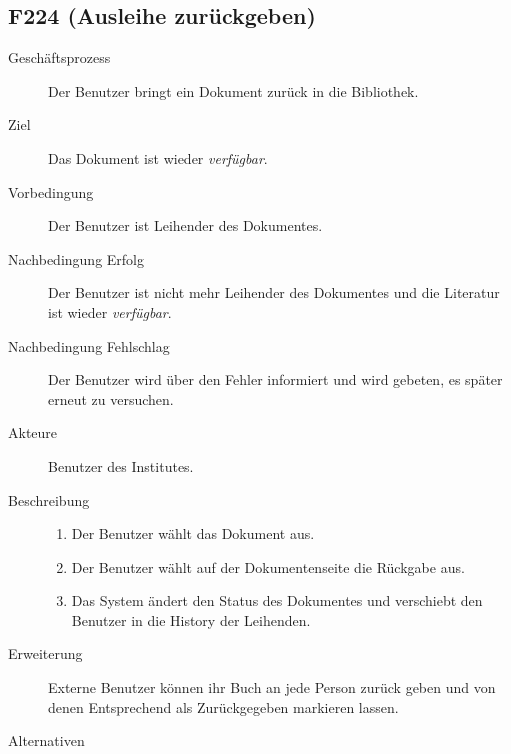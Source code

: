 \subsection{F224 (Ausleihe zurückgeben)}
\begin{description}
  \item[Geschäftsprozess]Der Benutzer bringt ein Dokument zurück in die Bibliothek.
  \item[Ziel]Das Dokument ist wieder \emph{verfügbar}.
  \item[Vorbedingung]Der Benutzer ist Leihender des Dokumentes.
  \item[Nachbedingung Erfolg]Der Benutzer ist nicht mehr Leihender des Dokumentes und die Literatur ist wieder \emph{verfügbar}.
  \item[Nachbedingung Fehlschlag]Der Benutzer wird über den Fehler informiert und wird gebeten, es später erneut zu versuchen.
  \item[Akteure]Benutzer des Institutes.
  \item[Beschreibung]\hfill
    \begin{enumerate}
      \item Der Benutzer wählt das Dokument aus.
      \item Der Benutzer wählt auf der Dokumentenseite die Rückgabe aus.
      \item Das System ändert den Status des Dokumentes und verschiebt den Benutzer in die History der Leihenden.
    \end{enumerate}
  \item[Erweiterung]Externe Benutzer können ihr Buch an jede Person zurück geben und von denen Entsprechend als Zurückgegeben markieren lassen.
  \item[Alternativen]
\end{description}

